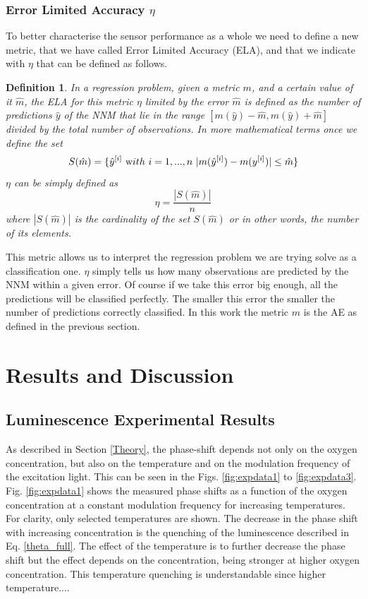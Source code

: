 \documentclass[9pt,twocolumn,twoside,pdftex]{optica}
\newtheorem*{definition*}{Definition}
\begin{document}
\subsubsection{Error Limited Accuracy $\eta$}

To better characterise the sensor performance as a whole we need to define a new metric, that we have called Error Limited Accuracy (ELA), and that we indicate with $\eta$ that can be defined as follows.

\begin{definition*}
In a regression problem, given a metric $m$, and a certain value of it $\hat m$, the ELA for this metric $\eta$ limited by the error $\hat m$ is defined as the number of predictions $\hat y$ of the NNM that lie in the range $[m(\hat y)-\hat m, m(\hat y)+\hat m]$ divided by the total number of observations. In more mathematical terms once we define the set
\begin{equation}
S(\hat m) = \{ \hat y^{[i]} \ {\text with } \ i = 1,..., n\ | m(\hat y^{[i]})-m(y^{[i]})|\leq \hat m \} 
\end{equation}
$\eta$ can be simply defined as
\begin{equation}
\eta = \frac{|S(\hat m)|}{n}
\end{equation}
where $|S(\hat m)|$ is the cardinality of the set $S(\hat m)$ or in other words, the number of its elements.
\end{definition*}

This metric allows us to interpret the regression problem we are trying solve as a classification one. $\eta$ simply tells us how many observations are predicted by the NNM within a given error. Of course if we take this error big enough, all the predictions will be classified perfectly. The smaller this error the smaller the number of predictions correctly classified. In this work the metric $m$ is the AE as defined in the previous section.

\section{Results and Discussion}
\label{Results}

\subsection{Luminescence Experimental Results}

As described in Section \ref{Theory}, the phase-shift depends not only on the oxygen concentration, but also on the temperature and on the modulation frequency of the excitation light. This can be seen in the Figs. \ref{fig:expdata1} to \ref{fig:expdata3}.
Fig. \ref{fig:expdata1} shows the measured phase shifts as a function of the oxygen concentration at a constant modulation frequency for increasing temperatures. For clarity, only selected temperatures are shown. The decrease in the phase shift with increasing concentration is the quenching of the luminescence described in Eq. \ref{theta_full}. The effect of the temperature is to further decrease the phase shift but the effect depends on the concentration, being stronger at higher oxygen concentration. This temperature quenching is understandable since higher temperature.... 
\end{document}

